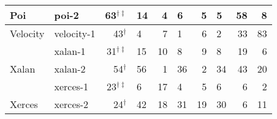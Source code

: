 \begin{figure*}[!htbp]
{{\begin{tabular}{rl|rl|rl|rl|rr|}
\multicolumn{1}{l|}{\multirow{-2}{*}{Poi}}    & poi-2      & \cellcolor[HTML]{C0C0C0}63$^{\dagger\ddagger}$                        & 14                                               & 4            & 6           & 5             & 5             & 58            & 8             \bigstrut[b]\\ \hline
\multicolumn{1}{l|}{Velocity}                 & velocity-1 & \cellcolor[HTML]{C0C0C0}43$^{\dagger}$                        & 4                                                & 7            & 1           & 6             & 2             & 33            & 83            \bigstrut\\ \hline
\multicolumn{1}{l|}{}                         & xalan-1    & \cellcolor[HTML]{C0C0C0}31$^{\dagger\ddagger}$                                              & 15                                               & 10           & 8           & 9             & 8             & 19            & 6             \bigstrut[t]\\
\multicolumn{1}{l|}{\multirow{-2}{*}{Xalan}}  & xalan-2    & 54$^{\dagger}$                                                                      & \cellcolor[HTML]{C0C0C0}56 & 1            & 36          & 2             & 34            & 43            & 20            \bigstrut[b]\\ \hline
\multicolumn{1}{l|}{}                         & xerces-1   & \cellcolor[HTML]{C0C0C0}23$^{\dagger\ddagger}$                                              & 6                                                & 17           & 4           & 5             & 6             & 6             & 2             \bigstrut[t]\\
\multicolumn{1}{l|}{\multirow{-2}{*}{Xerces}} & xerces-2   & 24$^{\dagger}$                                                                      & \cellcolor[HTML]{C0C0C0}42 & 18           & 31          & 19            & 30            & 6             & 11  \bigstrut[b]\\       
\end{tabular}}
\label{subfig:wp}}%



\end{figure*}

